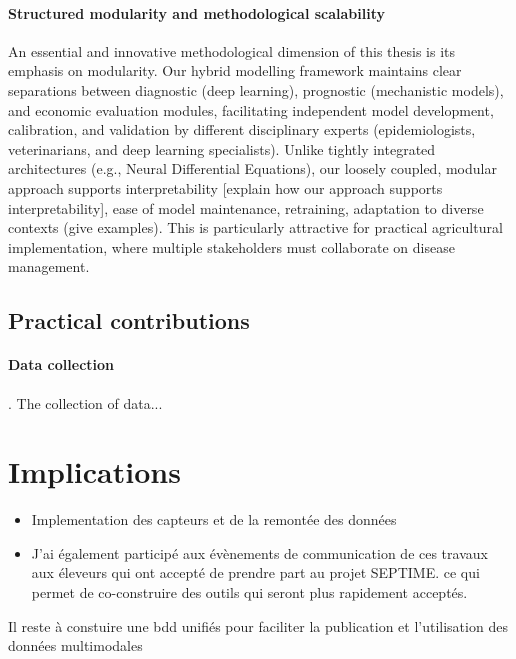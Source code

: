 \paragraph{Structured modularity and methodological scalability} An essential and innovative methodological dimension of this thesis is its emphasis on modularity. Our hybrid modelling framework maintains clear separations between diagnostic (deep learning), prognostic (mechanistic models), and economic evaluation modules, facilitating independent model development, calibration, and validation by different disciplinary experts (epidemiologists, veterinarians, and deep learning specialists). Unlike tightly integrated architectures (e.g., Neural Differential Equations), our loosely coupled, modular approach supports interpretability [explain how our approach supports interpretability], ease of model maintenance, retraining, adaptation to diverse contexts (give examples). This is particularly attractive for practical agricultural implementation, where multiple stakeholders must collaborate on disease management.


\subsection{Practical contributions}

\paragraph{Data collection}. The collection of data... 

\section{Implications}

\begin{itemize}
    \item Implementation des capteurs et de la remontée des données
    \item J'ai également participé aux évènements de communication de ces travaux aux éleveurs qui ont accepté de prendre part au projet SEPTIME. ce qui permet de co-construire des outils qui seront plus rapidement acceptés.
\end{itemize}


Il reste à constuire une bdd unifiés pour faciliter la publication et l'utilisation des données multimodales


